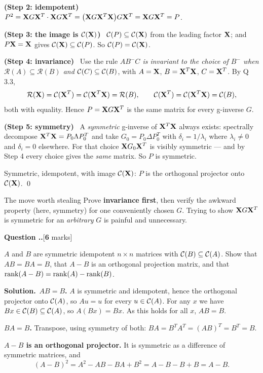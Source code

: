 \documentclass[11pt]{article}
\newcounter{qq}[section]
\newcommand{\qhead}[2]{\medskip\refstepcounter{qq}%
  \noindent\textbf{\color{Blue}Question \thesection.\theqq.}\hfill\textnormal{[\textbf{#1} marks]}%
  \ifx\relax#2\relax\else\par\smallskip\fi}
\newcommand{\sol}{\smallskip\noindent\textbf{\color{ForestGreen}Solution.}\ }
\newcommand{\pt}[1]{\smallskip\noindent\textbf{(#1)}\ }
\begin{document}
\pt{Step 2: idempotent} $P^2=\mathbf{X} G\mathbf{X}^T\cdot\mathbf{X} G\mathbf{X}^T=\big(\mathbf{X} G\mathbf{X}^T\mathbf{X}\big)G\mathbf{X}^T=\mathbf{X} G\mathbf{X}^T=P$.

\pt{Step 3: the image is $\mathcal{C}(\mathbf{X})$} $\mathcal{C}(P)\subseteq\mathcal{C}(\mathbf{X})$ from the leading factor $\mathbf{X}$;
and $P\mathbf{X}=\mathbf{X}$ gives $\mathcal{C}(\mathbf{X})\subseteq\mathcal{C}(P)$. So $\mathcal{C}(P)=\mathcal{C}(\mathbf{X})$.

\pt{Step 4: invariance} Use the rule \emph{$AB^-C$ is invariant to the choice of $B^-$ when
$\mathcal{R}(A)\subseteq\mathcal{R}(B)$ and $\mathcal{C}(C)\subseteq\mathcal{C}(B)$}, with $A=\mathbf{X}$,
$B=\mathbf{X}^T\mathbf{X}$, $C=\mathbf{X}^T$. By Q\,3.3,
\[
  \mathcal{R}(\mathbf{X})=\mathcal{C}(\mathbf{X}^T)=\mathcal{C}(\mathbf{X}^T\mathbf{X})=\mathcal{R}(B),
  \qquad
  \mathcal{C}(\mathbf{X}^T)=\mathcal{C}(\mathbf{X}^T\mathbf{X})=\mathcal{C}(B),
\]
both with equality. Hence $P=\mathbf{X} G\mathbf{X}^T$ is the same matrix for every g-inverse $G$.

\pt{Step 5: symmetry} A \emph{symmetric} g-inverse of $\mathbf{X}^T\mathbf{X}$ always exists: spectrally
decompose $\mathbf{X}^T\mathbf{X}=P_0\Lambda P_0^T$ and take $G_0=P_0\Delta P_0^T$ with
$\delta_i=1/\lambda_i$ where $\lambda_i\ne0$ and $\delta_i=0$ elsewhere. For that choice
$\mathbf{X} G_0\mathbf{X}^T$ is visibly symmetric --- and by Step 4 every choice gives the \emph{same}
matrix. So $P$ is symmetric.

Symmetric, idempotent, with image $\mathcal{C}(\mathbf{X})$: $P$ is the orthogonal projector onto
$\mathcal{C}(\mathbf{X})$. \qed

\begin{idea}{The move worth stealing}
Prove \textbf{invariance first}, then verify the awkward property (here, symmetry) for one
conveniently chosen $G$. Trying to show $\mathbf{X} G\mathbf{X}^T$ is symmetric for an \emph{arbitrary} $G$
is painful and unnecessary.
\end{idea}

\qhead{6}{}
\begin{stmt}
$A$ and $B$ are symmetric idempotent $n\times n$ matrices with $\mathcal{C}(B)\subseteq\mathcal{C}(A)$. Show
that $AB=BA=B$, that $A-B$ is an orthogonal projection matrix, and that
$\operatorname{rank}(A-B)=\operatorname{rank}(A)-\operatorname{rank}(B)$.
\end{stmt}

\sol \textbf{$AB=B$.} $A$ is symmetric and idempotent, hence the orthogonal projector onto
$\mathcal{C}(A)$, so $Au=u$ for every $u\in\mathcal{C}(A)$. For any $x$ we have $Bx\in\mathcal{C}(B)\subseteq\mathcal{C}(A)$,
so $A(Bx)=Bx$. As this holds for all $x$, $AB=B$.

\textbf{$BA=B$.} Transpose, using symmetry of both: $BA=B^TA^T=(AB)^T=B^T=B$.

\textbf{$A-B$ is an orthogonal projector.} It is symmetric as a difference of symmetric
matrices, and
\[
  (A-B)^2=A^2-AB-BA+B^2=A-B-B+B=A-B .
\]
\end{document}
